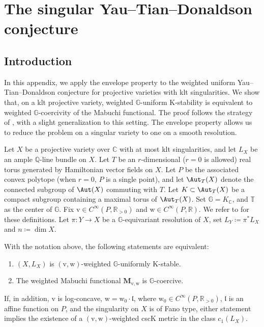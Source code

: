 \documentclass[11pt,a4paper]{article}
\begin{document}
\clearpage
\appendix
\section{The singular Yau--Tian--Donaldson conjecture}
\label{sec:appendix}

\subsection{Introduction}\label{subsec:appendix_introduction}

In this appendix, we apply the envelope property to the weighted uniform Yau--Tian--Donaldson conjecture for projective varieties with klt singularities. We show that, on a klt projective variety, weighted $\mathbb{G}$-uniform K-stability is equivalent to weighted $\mathbb{G}$-coercivity of the Mabuchi functional. The proof follows the strategy of \cite[Appendix~A]{T26App}, with a slight generalization to this setting. The envelope property allows us to reduce the problem on a singular variety to one on a smooth resolution.

Let $X$ be a projective variety over $\mathbb{C}$ with at most klt singularities, and let $L_X$ be an ample $\mathbb{Q}$-line bundle on $X$. Let $T$ be an $r$-dimensional ($r=0$ is allowed) real torus generated by Hamiltonian vector fields on $X$. Let $P$ be the associated convex polytope (when $r=0$, $P$ is a single point), and let $\Aut_T(X)$ denote the connected subgroup of $\Aut(X)$ commuting with $T$. Let $K \subset \Aut_T(X)$ be a compact subgroup containing a maximal torus of $\Aut_T(X)$. Set $\mathbb{G}=K_\mathbb{C}$, and $\mathbb{T}$ as the center of $\mathbb{G}$. Fix $\mathrm{v}\in C^\infty(P,\mathbb{R}_{>0})$ and $\mathrm{w}\in C^\infty(P,\mathbb{R})$. We refer to \cite[Section 1]{HL25} for these definitions. Let $\pi\colon Y\to X$ be a $\mathbb{G}$-equivariant resolution of $X$, set $L_Y\coloneqq\pi^*L_X$ and $n\coloneqq\dim X$.

\begin{theorem}\label{thm:weighted_uniform_YTD}
    With the notation above, the following statements are equivalent:
    \begin{enumerate}
        \item $(X,L_X)$ is $(\mathrm{v},\mathrm{w})$-weighted $\mathbb{G}$-uniformly K-stable.
        \item The weighted Mabuchi functional $\mathbf{M}_{\mathrm{v},\mathrm{w}}$ is $\mathbb{G}$-coercive.
    \end{enumerate}
    If, in addition, $\mathrm{v}$ is log-concave, $\mathrm{w}=\mathrm{w}_0\cdot\mathfrak{l}$, where $\mathrm{w}_0\in C^\infty(P,\mathbb{R}_{>0})$, $\mathfrak{l}$ is an affine function on $P$, and the singularity on $X$ is of Fano type, either statement implies the existence of a $(\mathrm{v},\mathrm{w})$-weighted cscK metric in the class $c_1(L_X)$.
\end{theorem}
\end{document}
